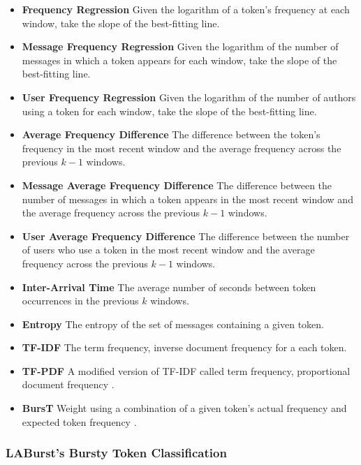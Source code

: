 \documentclass[letterpaper]{article}
\begin{document}
{
\small
\begin{itemize}
\item \textbf{Frequency Regression} Given the logarithm of a token's frequency at each window, take the slope of the best-fitting line.
\item \textbf{Message Frequency Regression} Given the logarithm of the number of messages in which a token appears for each window, take the slope of the best-fitting line.
\item \textbf{User Frequency Regression} Given the logarithm of the number of authors using a token for each window, take the slope of the best-fitting line.
\item \textbf{Average Frequency Difference} The difference between the token's frequency in the most recent window and the average frequency across the previous $k -1$ windows.
\item \textbf{Message Average Frequency Difference} The difference between the number of messages in which a token appears in the most recent window and the average frequency across the previous $k -1$ windows.
\item \textbf{User Average Frequency Difference} The difference between the number of users who use a token in the most recent window and the average frequency across the previous $k -1$ windows.
\item \textbf{Inter-Arrival Time} The average number of seconds between token occurrences in the previous $k$ windows.
\item \textbf{Entropy} The entropy of the set of messages containing a given token.
\item \textbf{TF-IDF} The term frequency, inverse document frequency for a each token.
\item \textbf{TF-PDF} A modified version of TF-IDF called term frequency, proportional document frequency \cite{Bun:2002:TEN:645962.674082}.
\item \textbf{BursT} Weight using a combination of a given token's actual frequency and expected token frequency \cite{Lee:2011:BDT:2009463.2009531}.
\end{itemize}
}

\subsubsection{LABurst's Bursty Token Classification}
\end{document}
